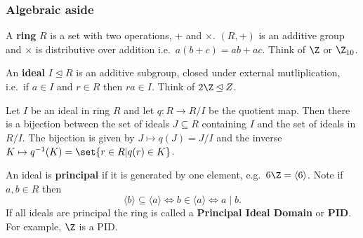 \documentclass{article}
\newcommand{\1}[1]{\mathbbm{1}_{#1}}
\begin{document}
\subsubsection*{Algebraic aside}
A \textbf{ring} $R$ is a set with two operations, $+$ and $\times$. $(R, +)$ is an additive group and $\times$ is distributive over addition i.e.\ $a(b+c)=ab+ac$. Think of $\Z$ or $\Z_{10}$.

An \textbf{ideal} $I \unlhd R$ is an additive subgroup, closed under external mutliplication, i.e.\ if $a \in I$ and $r \in R$ then $ra \in I$. Think of $2\Z \unlhd Z$.
\begin{nlemma}\label{lem:2.27}
    Let $I$ be an ideal in ring $R$ and let $q: R \to R/I$ be the quotient map.
    Then there is a bijection between the set of ideals $J \subseteq R$ containing $I$ and the set of ideals in $R/I$.
    The bijection is given by $J \mapsto q(J) = J/I$ and the inverse $K \mapsto q^{-1}(K) = \set{r \in R | q(r) \in K}$.
\end{nlemma}
An ideal is \textbf{principal} if it is generated by one element, e.g.\ $6\Z = \langle6 \rangle$.
Note if $a,b\in R$ then
\begin{equation*}
    \langle b \rangle \subseteq \langle a \rangle \iff b \in \langle a \rangle \iff a \mid b.
\end{equation*}
If all ideals are principal the ring is called a \textbf{Principal Ideal Domain} or \textbf{PID}.
For example, $\Z$ is a PID.
\end{document}
